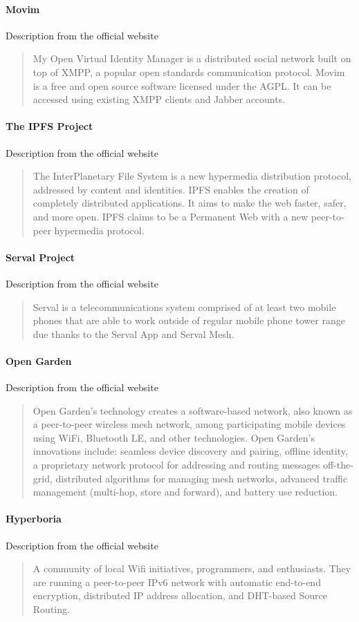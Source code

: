 \paragraph{Movim}
Description from the official website \cite{MovimMovim}
\blockquote{My Open Virtual Identity Manager is a distributed social network built on top of XMPP, a popular open standards communication protocol. Movim is a free and open source software licensed under the AGPL. It can be accessed using existing XMPP clients and Jabber accounts.}

\paragraph{The IPFS Project\cite{Benet2014IPFS-ContentSystem}}
Description from the official website \cite{IPFSTheProject}
\blockquote{The InterPlanetary File System is a new hypermedia distribution protocol, addressed by content and identities. IPFS enables the creation of completely distributed applications. It aims to make the web faster, safer, and more open. IPFS claims to be a Permanent Web with a new peer-to-peer hypermedia protocol.}

\paragraph{Serval Project\cite{Gardner-stephen2011TheTelecommunications}}
Description from the official website \cite{ServalServalProject}
\blockquote{Serval is a telecommunications system comprised of at least two mobile phones that are able to work outside of regular mobile phone tower range due thanks to the Serval App and Serval Mesh.}

\paragraph{Open Garden}
Description from the official website \cite{GardenOpenGarden}
\blockquote{Open Garden's technology creates a software-based network, also known as a peer-to-peer wireless mesh network, among participating mobile devices using WiFi, Bluetooth LE, and other technologies. Open Garden's innovations include: seamless device discovery and pairing, offline identity, a proprietary network protocol for addressing and routing messages off-the-grid, distributed algorithms for managing mesh networks, advanced traffic management (multi-hop, store and forward), and battery use reduction.}

\paragraph{Hyperboria\cite{HypeHyperboriaWhitepaper}}
Description from the official website \cite{HyperboriaHyperboria}
\blockquote{A community of local Wifi initiatives, programmers, and enthusiasts. They are running a peer-to-peer IPv6 network with automatic end-to-end encryption, distributed IP address allocation, and DHT-based Source Routing.}

